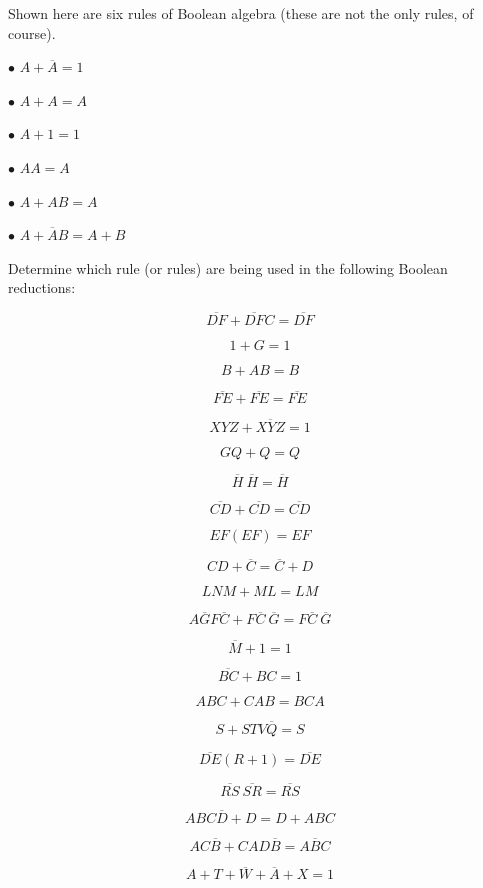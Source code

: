

Shown here are six rules of Boolean algebra (these are not the only rules, of course).  

\medskip
\item{$\bullet$} $A + \overline{A} = 1$
\item{$\bullet$} $A + A = A$
\item{$\bullet$} $A + 1 = 1$
\item{$\bullet$} $AA = A$
\item{$\bullet$} $A + AB = A$
\item{$\bullet$} $A + \overline{A}B = A + B$
\medskip

Determine which rule (or rules) are being used in the following Boolean reductions:

$$\overline{DF} + \overline{DF} C = \overline{DF}$$

$$1 + G = 1$$

$$B + AB = B$$

$$\overline{FE} + \overline{FE} = \overline{FE}$$

$$XYZ + \overline{XYZ} = 1$$

$$GQ + Q = Q$$

$$\overline{H} \> \overline{H} = \overline{H}$$

$$\overline{CD} + \overline{CD} = \overline{CD}$$

$$EF(EF) = EF$$

$$CD + \overline{C} = \overline{C} + D$$

$$LNM + ML = LM$$

$$A \overline{G} F \overline{C} + F \overline{C} \> \overline{G} = F \overline{C} \> \overline{G}$$

$$\overline{M} + 1 = 1$$

$$\overline{BC} + BC = 1$$

$$ABC + CAB = BCA$$

$$S + STV \overline{Q} = S$$

$$\overline{DE}(R + 1) = \overline{DE}$$

$$\overline{RS} \> \overline{SR} = \overline{RS}$$

$$ABC\overline{D} + D = D + ABC$$

$$AC\overline{B} + CAD \overline{B} = A \overline{B} C$$

$$A + T + \overline{W} + \overline{A} + X = 1$$

